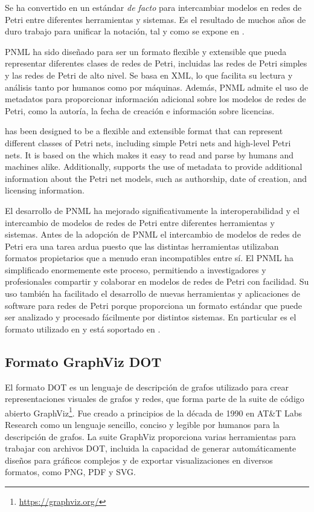 Se ha convertido en un estándar \emph{de facto} para intercambiar modelos en redes de Petri entre
diferentes herramientas y sistemas. Es el resultado de muchos años de duro trabajo para
unificar la notación, tal y como se expone en \cite{hillah:hal-01176335}.

\acrshort{PNML} ha sido diseñado para ser un formato flexible y extensible que pueda representar
diferentes clases de redes de Petri, incluidas las redes de Petri simples y las redes de Petri de
alto nivel. Se basa en \acrfull{XML}, lo que facilita su lectura y
análisis tanto por humanos como por máquinas. Además, \acrshort{PNML} admite el uso de metadatos
para proporcionar información adicional sobre los modelos de redes de Petri, como la autoría,
la fecha de creación e información sobre licencias.

has been designed to be a flexible and extensible format
that can represent different classes of Petri nets,
including simple Petri nets and high-level Petri nets.
It is based on the
which makes it easy to read and parse by humans and machines alike.
Additionally,  supports the use of metadata
to provide additional information about the Petri net models,
such as authorship, date of creation, and licensing information.

El desarrollo de \acrshort{PNML} ha mejorado significativamente la interoperabilidad y el intercambio de
modelos de redes de Petri entre diferentes herramientas y sistemas. Antes de la adopción de
\acrshort{PNML} el intercambio de modelos de redes de Petri era una tarea ardua puesto que las distintas
herramientas utilizaban formatos propietarios que a menudo eran incompatibles entre sí. El
\acrshort{PNML} ha simplificado enormemente este proceso, permitiendo a investigadores y profesionales
compartir y colaborar en modelos de redes de Petri con facilidad. Su uso también
ha facilitado el desarrollo de nuevas herramientas y aplicaciones de software para redes de
Petri porque proporciona un formato estándar que puede ser analizado y procesado fácilmente
por distintos sistemas. En particular es el formato utilizado en \cite{zhang2022deadlocks} y está
soportado en \cite{meyer2020}.

\subsection{Formato GraphViz DOT}

El formato DOT es un lenguaje de descripción de grafos utilizado para crear representaciones
visuales de grafos y redes, que forma parte de la suite de código abierto GraphViz\footnote{\url{https://graphviz.org/}}.
Fue creado a principios de la década de 1990 en AT\&T Labs Research como un lenguaje sencillo, conciso y
legible por humanos para la descripción de grafos. La suite GraphViz proporciona varias
herramientas para trabajar con archivos DOT, incluida la capacidad de generar
automáticamente diseños para gráficos complejos y de exportar visualizaciones en diversos
formatos, como PNG, PDF y SVG.

